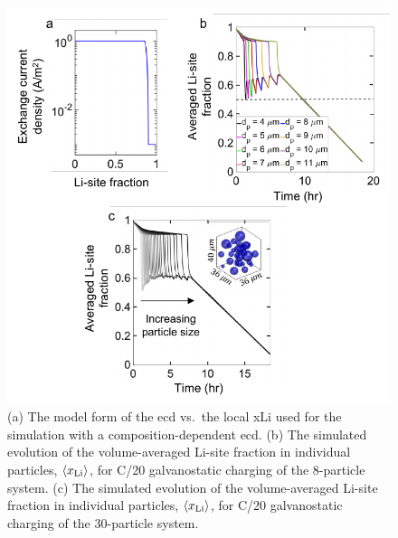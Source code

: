 \documentclass{article}
\begin{document}
\newpage
\begin{figure}[!h]
  \includegraphics[scale =1]{figures/modeling_figure_1.pdf}
  \caption{(a) The model form of the \gls{ecd} vs.\ the
    local \gls{xLi} used for the simulation with a
    composition-dependent \gls{ecd}. (b) The simulated evolution of
    the volume-averaged Li-site fraction in individual particles,
    $\left\langle x_{\rm{Li}}\right\rangle $, for C/20 galvanostatic
    charging of the 8-particle system. (c) The simulated evolution of
    the volume-averaged Li-site fraction in individual particles,
    $\left\langle x_{\rm{Li}}\right\rangle $, for C/20 galvanostatic
    charging of the 30-particle system.}
  \label{fig:model-1}
\end{figure}
\end{document}
